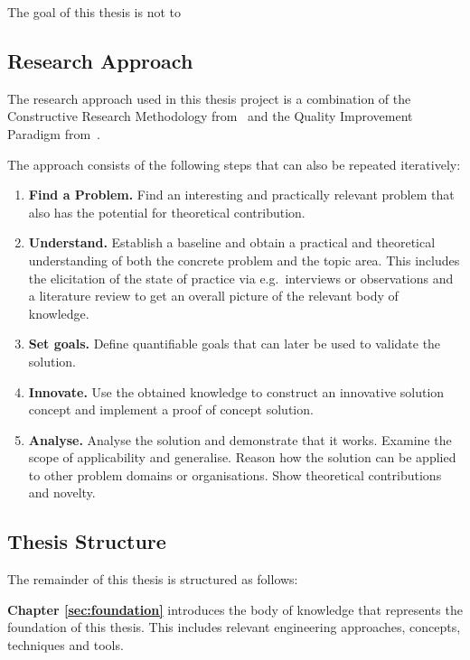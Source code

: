 The goal of this thesis is not to 

\clearpage
\subsection{Research Approach}

The research approach used in this thesis project is a combination of the Constructive Research
Methodology from~\cite{Lukka:2003} and the Quality Improvement Paradigm from~\cite{Wohlin:2006}.

The approach consists of the following steps that can also be repeated iteratively:

\begin{enumerate}
    \item \textbf{Find a Problem.} Find an interesting and practically relevant problem that also
        has the potential for theoretical contribution.
    \item \textbf{Understand.} Establish a baseline and obtain a practical and theoretical
        understanding of both the concrete problem and the topic area. This includes the
        elicitation of the state of practice via e.g.~interviews or observations and a
        literature review to get an overall picture of the relevant body of knowledge.
    \item \textbf{Set goals.} Define quantifiable goals that can later be used to validate the
        solution.
    \item \textbf{Innovate.} Use the obtained knowledge to construct an innovative solution
        concept and implement a proof of concept solution.
    \item \textbf{Analyse.} Analyse the solution and demonstrate that it works. Examine the scope
        of applicability and generalise. Reason how the solution can be applied to other problem
        domains or organisations. Show theoretical contributions and novelty.
\end{enumerate}


\subsection{Thesis Structure}

The remainder of this thesis is structured as follows:

\textbf{Chapter \ref{sec:foundation}} introduces the body of knowledge that represents the
foundation of this thesis. This includes relevant engineering approaches, concepts, techniques and tools.

